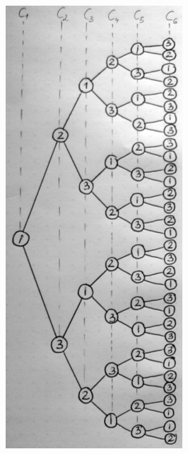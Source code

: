         \begin{figure}
            \includegraphics[width=1\linewidth]{baum_kreativ}
        \end{figure}

